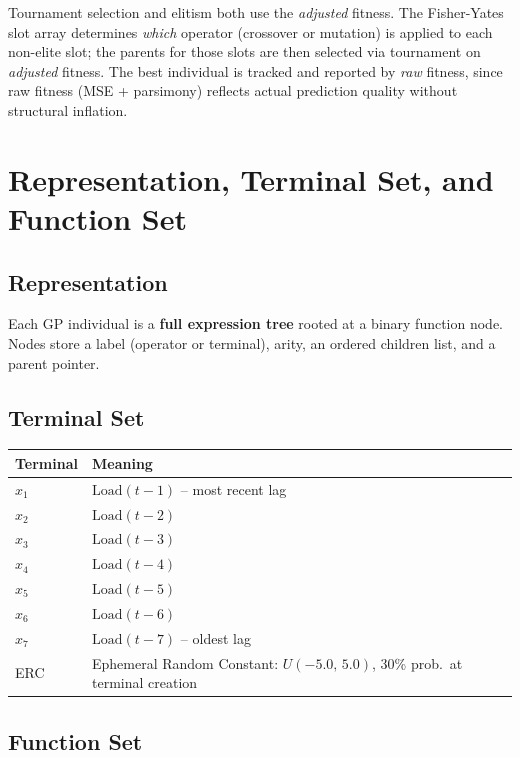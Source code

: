 \documentclass[12pt,a4paper]{article}
\begin{document}
Tournament selection and elitism both use the \emph{adjusted} fitness. The
Fisher-Yates slot array determines \emph{which} operator (crossover or mutation)
is applied to each non-elite slot; the parents for those slots are then selected
via tournament on \emph{adjusted} fitness. The best individual is tracked and
reported by \emph{raw} fitness, since raw fitness (MSE + parsimony) reflects
actual prediction quality without structural inflation.

\section{Representation, Terminal Set, and Function Set}

\subsection{Representation}

Each GP individual is a \textbf{full expression tree} rooted at a binary function
node. Nodes store a label (operator or terminal), arity, an ordered children list,
and a parent pointer.

\subsection{Terminal Set}

\begin{center}
\begin{tabular}{@{}ll@{}}
\toprule
\textbf{Terminal} & \textbf{Meaning} \\
\midrule
$x_1$ & $\text{Load}(t{-}1)$ -- most recent lag \\
$x_2$ & $\text{Load}(t{-}2)$ \\
$x_3$ & $\text{Load}(t{-}3)$ \\
$x_4$ & $\text{Load}(t{-}4)$ \\
$x_5$ & $\text{Load}(t{-}5)$ \\
$x_6$ & $\text{Load}(t{-}6)$ \\
$x_7$ & $\text{Load}(t{-}7)$ -- oldest lag \\
ERC   & Ephemeral Random Constant: $U(-5.0,\,5.0)$, 30\% prob.\ at terminal creation \\
\bottomrule
\end{tabular}
\end{center}

\subsection{Function Set}
\end{document}
